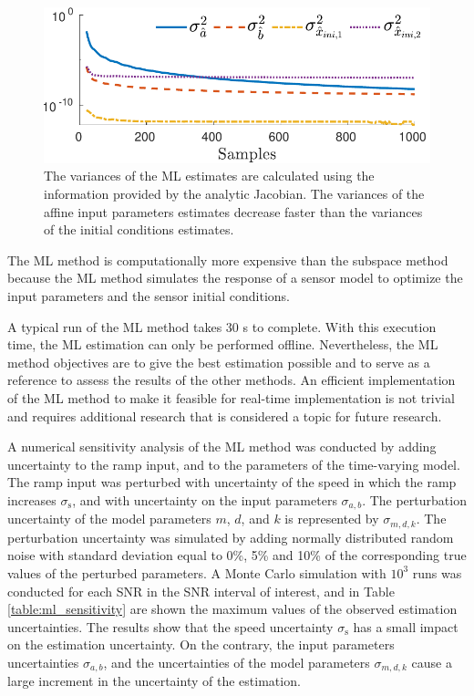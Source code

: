\begin{figure}[!htbp]
\centering
\includegraphics[width=1\columnwidth]{./ChapterRampInput/fig/Fig_8.pdf} 
\caption{ \label{fig:cov_lo_40dB_s1} The variances of the ML estimates are calculated using the information provided by the analytic Jacobian. The variances of the affine input parameters estimates decrease faster than the variances of the initial conditions estimates.  }
\end{figure}

The ML method is  computationally more expensive than the subspace method because the ML method simulates the response of a sensor model to optimize the input parameters and the sensor initial conditions.

A typical run of the ML method takes 30 s to complete.
With this execution time, the ML estimation can only be performed offline.
Nevertheless, the ML method objectives are to give the best estimation possible and to serve as a reference to assess the results of the other methods.
An efficient implementation of the ML method to make it feasible for real-time implementation is not trivial and requires additional research that is considered a topic for future research.

A numerical sensitivity analysis of the ML method was conducted by adding uncertainty to the ramp input, and to the parameters of the time-varying model. 
The ramp input was perturbed with uncertainty of the speed in which the ramp increases $\sigma_{\mathrm{s}}$, and with uncertainty on the input parameters $\sigma_{a,b}$. 
The perturbation uncertainty of the model parameters $m$, $d$, and $k$ is represented by $\sigma_{m,d,k}$. 
The perturbation uncertainty was simulated by adding normally distributed random noise with standard deviation equal to 0\%, 5\% and 10\% of the corresponding true values of the perturbed parameters.
A Monte Carlo simulation with $10^3$ runs was conducted for each SNR in the SNR interval of interest, and in Table \ref{table:ml_sensitivity} are shown the maximum values of the observed estimation uncertainties. 
The results show that the speed uncertainty $\sigma_{\mathrm{s}}$ has a small impact on the estimation uncertainty.
On the contrary, the input parameters uncertainties $\sigma_{a,b}$, and the uncertainties of the model parameters $\sigma_{m,d,k}$ cause a large increment in the uncertainty of the estimation.

